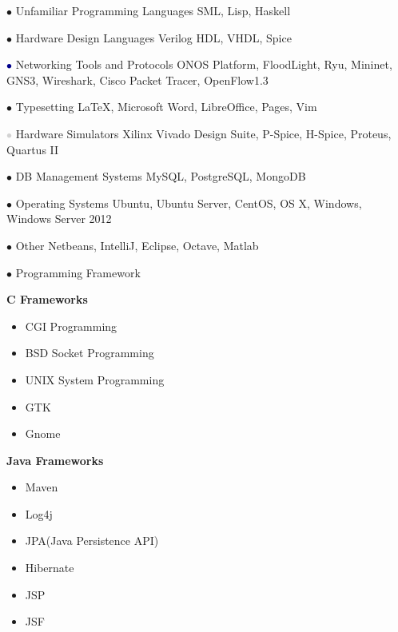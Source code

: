 \documentclass[]{friggeri-cv} %
\begin{document}
\begin{entrylist}

\entry
{\textcolor{TextGreen}{$\bullet$}}
{Unfamiliar Programming Languages}
{}
{SML, Lisp, Haskell}


\entry
{\textcolor{TextOrange}{$\bullet$}}
{Hardware Design Languages}
{}
{Verilog HDL, VHDL, Spice}


\entry
{\textcolor{DarkBlue}{$\bullet$}}
{Networking Tools and Protocols}
{}
{ONOS Platform, FloodLight, Ryu, Mininet, GNS3, Wireshark, Cisco Packet Tracer, OpenFlow1.3}


\entry
{\textcolor{Ocean}{$\bullet$}}
{Typesetting}
{}
{\LaTeX, Microsoft Word, LibreOffice, Pages, Vim}


\entry
{\textcolor{LightGray}{$\bullet$}}
{Hardware Simulators}
{}
{Xilinx Vivado Design Suite, P-Spice, H-Spice, Proteus, Quartus II}


\entry
{\textcolor{TextYellow}{$\bullet$}}
{DB Management Systems}
{}
{MySQL, PostgreSQL, MongoDB}


\entry
{\textcolor{TextRed}{$\bullet$}}
{Operating Systems}
{}
{Ubuntu, Ubuntu Server, CentOS, OS X, Windows, Windows Server 2012}


\entry
{\textcolor{TextPink}{$\bullet$}}
{Other}
{}
{Netbeans, IntelliJ, Eclipse, Octave, Matlab}


\entry
{\textcolor{UniBlue}{$\bullet$}}
{Programming Framework}
{}
{
	\textbf{C Frameworks}
	\begin{itemize}
		\item CGI Programming
		\item BSD Socket Programming
		\item UNIX System Programming
		\item GTK
		\item Gnome
	\end{itemize}
	
	\textbf{Java Frameworks}
	\begin{itemize}
		\item Maven
		\item Log4j
		\item JPA(Java Persistence API)
		\item Hibernate
		\item JSP
		\item JSF
	\end{itemize}
}



\end{entrylist}
\end{document}
